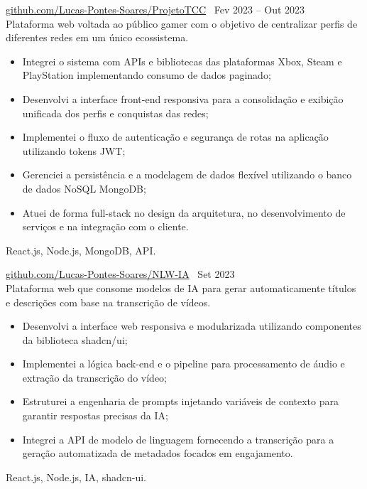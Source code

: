         
 \textbar{}  \href{https://github.com/Lucas-Pontes-Soares/ProjetoTCC}{github.com/Lucas-Pontes-Soares/ProjetoTCC} \hfill\ Fev 2023 -- Out 2023 \\
Plataforma web voltada ao público gamer com o objetivo de centralizar perfis de diferentes redes em um único ecossistema.
\begin{itemize}
    \item Integrei o sistema com APIs e bibliotecas das plataformas Xbox, Steam e PlayStation implementando consumo de dados paginado;
    \item Desenvolvi a interface front-end responsiva para a consolidação e exibição unificada dos perfis e conquistas das redes;
    \item Implementei o fluxo de autenticação e segurança de rotas na aplicação utilizando tokens JWT;
    \item Gerenciei a persistência e a modelagem de dados flexível utilizando o banco de dados NoSQL MongoDB;
    \item Atuei de forma full-stack no design da arquitetura, no desenvolvimento de serviços e na integração com o cliente.
\end{itemize}
 React.js, Node.js, MongoDB, API.

        
 \textbar{}  \href{https://github.com/Lucas-Pontes-Soares/NLW-IA}{github.com/Lucas-Pontes-Soares/NLW-IA} \hfill\ Set 2023 \\
Plataforma web que consome modelos de IA para gerar automaticamente títulos e descrições com base na transcrição de vídeos.
\begin{itemize}
    \item Desenvolvi a interface web responsiva e modularizada utilizando componentes da biblioteca shadcn/ui;
    \item Implementei a lógica back-end e o pipeline para processamento de áudio e extração da transcrição do vídeo;
    \item Estruturei a engenharia de prompts injetando variáveis de contexto para garantir respostas precisas da IA;
    \item Integrei a API de modelo de linguagem fornecendo a transcrição para a geração automatizada de metadados focados em engajamento.
\end{itemize}
 React.js, Node.js, IA, shadcn-ui.

